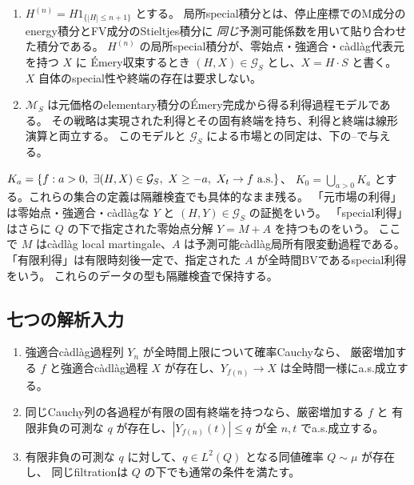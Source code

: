 \begin{definition}[元価格の積分graphと終端市場]\label{def:boundary-data}
\leavevmode\par
\begin{enumerate}
\item {}
$H^{(n)}=H1_{\{|H|\leq n+1\}}$ とする。
局所special積分とは、停止座標でのM成分のenergy積分とFV成分のStieltjes積分に
\emph{同じ}予測可能係数を用いて貼り合わせた積分である。
$H^{(n)}$ の局所special積分が、零始点・強適合・càdlàg代表元を持つ $X$ に
Émery収束するとき $(H,X)\in\mathcal G_S$ とし、$X=H\cdot S$ と書く。
$X$ 自体のspecial性や終端の存在は要求しない。
\item {}
$\mathcal M_S$ は元価格のelementary積分のÉmery完成から得る利得過程モデルである。
その戦略は実現された利得とその固有終端を持ち、利得と終端は線形演算と両立する。
このモデルと $\mathcal G_S$ による市場との同定は、下の--で与える。
\end{enumerate}
$K_a=\{f:a>0,\ \exists(H,X)\in\mathcal G_S,\ X\geq-a,\ X_t\to f\ \mathrm{a.s.}\}$、
$K_0=\bigcup_{a>0}K_a$ とする。これらの集合の定義は隔離検査でも具体的なまま残る。
「元市場の利得」は零始点・強適合・càdlàgな $Y$ と $(H,Y)\in\mathcal G_S$ の証拠をいう。
「special利得」はさらに $Q$ の下で指定された零始点分解 $Y=M+A$ を持つものをいう。
ここで $M$ はcàdlàg local martingale、$A$ は予測可能càdlàg局所有限変動過程である。
「有限利得」は有限時刻後一定で、指定された $A$ が全時間BVであるspecial利得をいう。
これらのデータの型も隔離検査で保持する。
\end{definition}

\subsection{七つの解析入力}
\begin{proposition}\label{input:paths}
\leavevmode\par
\begin{enumerate}
\item {}
強適合càdlàg過程列 $Y_n$ が全時間上限について確率Cauchyなら、
厳密増加する $f$ と強適合càdlàg過程 $X$ が存在し、$Y_{f(n)}\to X$ は全時間一様にa.s.成立する。
\item {}
同じCauchy列の各過程が有限の固有終端を持つなら、厳密増加する $f$ と
有限非負の可測な $q$ が存在し、$|Y_{f(n)}(t)|\leq q$ が全 $n,t$ でa.s.成立する。
\item {}
有限非負の可測な $q$ に対して、$q\in L^2(Q)$ となる同値確率 $Q\sim\mu$ が存在し、
同じfiltrationは $Q$ の下でも通常の条件を満たす。
\end{enumerate}
\end{proposition}

